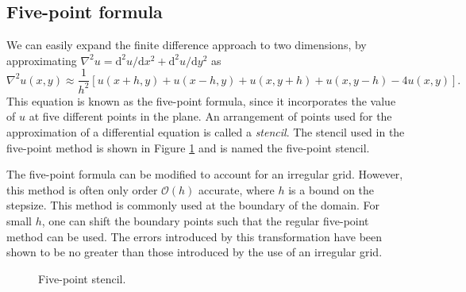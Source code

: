 \documentclass[a4paper]{article}
\newcommand{\dd}{\mathrm{d}}
\begin{document}
\subsection{Five-point formula}

We can easily expand the finite difference approach to two dimensions,
by approximating $\nabla^2 u = \dd^2 u / \dd x^2 + \dd^2 u / \dd y^2$
as
\begin{equation}
  \nabla^2 u(x, y) \approx \frac{1}{h^2} \left[
      u(x + h, y) + u(x - h, y) + u(x, y + h)
      + u(x, y - h) - 4 u(x, y) \right].
\end{equation}
This equation is known as the five-point formula, since it
incorporates the value of $u$ at five different points in the plane.
An arrangement of points used for the approximation of a differential
equation is called a \emph{stencil}. The stencil used in the
five-point method is shown in Figure \ref{fig:5pt} and is named the
five-point stencil.

The five-point formula can be modified to account for an irregular
grid. However, this method is often only order $\mathcal{O}(h)$
accurate, where $h$ is a bound on the stepsize. This method is
commonly used at the boundary of the domain. For small $h$, one can
shift the boundary points such that the regular five-point method can
be used. The errors introduced by this transformation have been shown
to be no greater than those introduced by the use of an irregular
grid.

\begin{figure}
  \begin{center}
  \end{center}
  \caption{Five-point stencil.} \label{fig:5pt}
\end{figure}
\end{document}

